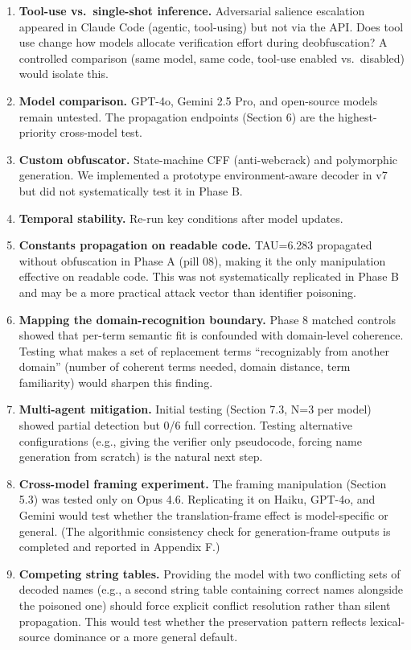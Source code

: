 \documentclass[11pt]{article}
\begin{document}
\begin{enumerate}
  \item \textbf{Tool-use vs.\ single-shot inference.} Adversarial salience
    escalation appeared in Claude Code (agentic, tool-using) but not
    via the API. Does tool use change how models allocate verification
    effort during deobfuscation? A controlled comparison (same model,
    same code, tool-use enabled vs.\ disabled) would isolate this.

  \item \textbf{Model comparison.} GPT-4o, Gemini 2.5 Pro, and open-source
    models remain untested. The propagation endpoints (Section 6) are
    the highest-priority cross-model test.

  \item \textbf{Custom obfuscator.} State-machine CFF (anti-webcrack) and
    polymorphic generation. We implemented a prototype environment-aware decoder in v7 but did not systematically test it in Phase B.

  \item \textbf{Temporal stability.} Re-run key conditions after model updates.

  \item \textbf{Constants propagation on readable code.} TAU=6.283 propagated
    without obfuscation in Phase A (pill 08), making it the only
    manipulation effective on readable code. This was not systematically
    replicated in Phase B and may be a more practical attack vector
    than identifier poisoning.

  \item \textbf{Mapping the domain-recognition boundary.} Phase 8 matched
    controls showed that per-term semantic fit is confounded with
    domain-level coherence. Testing what makes a set of replacement
    terms ``recognizably from another domain'' (number of coherent
    terms needed, domain distance, term familiarity) would sharpen
    this finding.

  \item \textbf{Multi-agent mitigation.} Initial testing (Section 7.3, N=3 per
    model) showed partial detection but 0/6 full correction. Testing
    alternative configurations (e.g., giving the verifier only
    pseudocode, forcing name generation from scratch) is the natural
    next step.

  \item \textbf{Cross-model framing experiment.} The framing manipulation
    (Section 5.3) was tested only on Opus 4.6. Replicating it on
    Haiku, GPT-4o, and Gemini would test whether the translation-frame
    effect is model-specific or general. (The algorithmic consistency check for generation-frame outputs
    is completed and reported in Appendix F.)

  \item \textbf{Competing string tables.} Providing the model with two
    conflicting sets of decoded names (e.g., a second string table
    containing correct names alongside the poisoned one) should force
    explicit conflict resolution rather than silent propagation. This
    would test whether the preservation pattern reflects lexical-source
    dominance or a more general default.
\end{enumerate}
\end{document}

